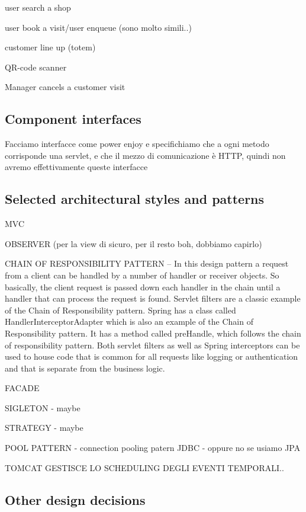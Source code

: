 user search a shop

user book a visit/user enqueue (sono molto simili..)

customer line up (totem)

QR-code scanner

Manager cancels a customer visit

\subsection{Component interfaces}
\label{subsect:componentinterfaces}

Facciamo interfacce come power enjoy e specifichiamo che a ogni metodo corrisponde una servlet, e che il mezzo di comunicazione è HTTP, quindi non avremo effettivamente queste interfacce

\subsection{Selected architectural styles and patterns}
\label{subsect:selectedarchitecturalstylesandpatterns}

MVC

OBSERVER (per la view di sicuro, per il resto boh, dobbiamo capirlo)

CHAIN OF RESPONSIBILITY PATTERN – In this design pattern a request from a client can be handled by a number of handler or receiver objects. So basically, the client request is passed down each handler in the chain until a handler that can process the request is found. Servlet filters are a classic example of the Chain of Responsibility pattern. Spring has a class called HandlerInterceptorAdapter which is also an example of the Chain of Responsibility pattern. It has a method called preHandle, which follows the chain of responsibility pattern. Both servlet filters as well as Spring interceptors can be used to house code that is common for all requests like logging or authentication and that is separate from the business logic.

FACADE

SIGLETON - maybe

STRATEGY - maybe

POOL PATTERN - connection pooling patern JDBC - oppure no se usiamo JPA

TOMCAT GESTISCE LO SCHEDULING DEGLI EVENTI TEMPORALI..

\subsection{Other design decisions}
\label{subsect:otherdesigndecisions}


